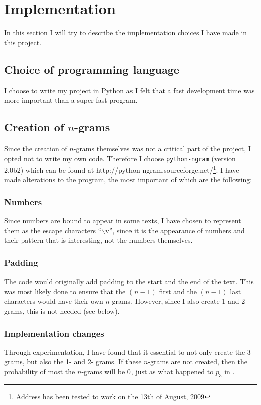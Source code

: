 \section{Implementation}
\label{implementation}

In this section I will try to describe the implementation choices I have made in this project.

\subsection{Choice of programming language}
I choose to write my project in Python as I felt that a fast development time was more important than a super fast program.

\subsection{Creation of $n$-grams}
Since the creation of $n$-grams themselves was not a critical part of the project, I opted not to write my own code. Therefore I choose \texttt{python-ngram} (version 2.0b2) which can be found at http://python-ngram.sourceforge.net/\footnote{Address has been tested to work on the 13th of August, 2009}. I have made alterations to the program, the most important of which are the following:

\subsubsection*{Numbers}
Since numbers are bound to appear in some texts, I have chosen to represent them as the escape characters ``$\backslash$v'', since it is the appearance of numbers and their pattern that is interesting, not the numbers themselves.

\subsubsection*{Padding}
The code would originally add padding to the start and the end of the text. This was most likely done to ensure that the $(n-1)$ first and the $(n-1)$ last characters would have their own $n$-grams. However, since I also create 1 and 2 grams, this is not needed (see below).

\subsubsection*{Implementation changes}
Through experimentation, I have found that it essential to not only create the 3-grams, but also the 1- and 2- grams. If these $n$-grams are not created, then the probability of most the $n$-grams will be 0, just as what happened to $p_3$ in .

